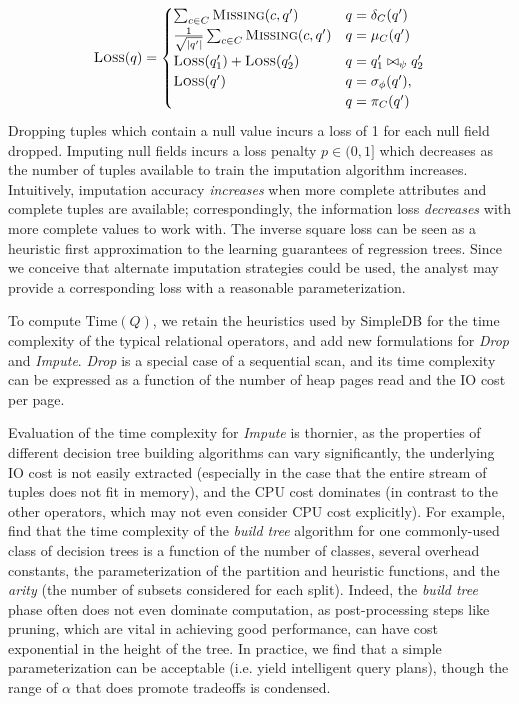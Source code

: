 \begin{align*}
  \textsc{Loss}(q) = \begin{cases}
    \sum_{c \in C} \textsc{Missing}(c, q') & q = \delta_C(q') \\
    \frac{1}{\sqrt{|q'|}} \sum_{c \in C} \textsc{Missing}(c, q') & q = \mu_C(q') \\
    \textsc{Loss}(q_1') + \textsc{Loss}(q_2') & q = q_1' \bowtie_\psi q_2' \\
    \textsc{Loss}(q') & q = \sigma_\phi(q'), \\ & q = \pi_C(q') \\
  \end{cases}
\end{align*}
Dropping tuples which contain a null value incurs a loss of 1 for each null field dropped.
Imputing null fields incurs a loss penalty $p \in (0, 1]$ which decreases as the number of
tuples available to train the imputation algorithm increases.  Intuitively, imputation
accuracy \textit{increases} when more complete attributes and complete tuples are available;
correspondingly, the information loss \textit{decreases} with more complete values to work
with. The inverse square loss can be seen as a heuristic first approximation to the learning guarantees of
regression trees. Since we conceive that
alternate imputation strategies could be used, the analyst may provide a corresponding
loss with a reasonable parameterization.

To compute $\text{Time}(Q)$, we retain the heuristics used by SimpleDB for the time
complexity of the typical relational operators, and add new formulations for \textit{Drop}
and \textit{Impute}. \textit{Drop} is a special case of a sequential scan, and its time
complexity can be expressed as a function of the number of heap pages read and the IO cost
per page.

Evaluation of the time complexity for \textit{Impute} is thornier, as the properties of
different decision tree building algorithms can vary significantly, the underlying IO cost
is not easily extracted (especially in the case that the entire stream of tuples does not
fit in memory), and the CPU cost dominates (in contrast to the other operators, which may
not even consider CPU cost explicitly). For example, \cite{martin1995time} find that the
time complexity of the \textit{build tree} algorithm for one commonly-used class of
decision trees is a function of the number of classes, several overhead constants, the
parameterization of the partition and heuristic functions, and the \textit{arity} (the
number of subsets considered for each split). Indeed, the \textit{build tree} phase often
does not even dominate computation, as post-processing steps like pruning, which are vital
in achieving good performance, can have cost exponential in the height of the tree. In
practice, we find that a simple parameterization can be acceptable (i.e. yield intelligent query
plans), though the range of $\alpha$ that does promote tradeoffs is condensed.

